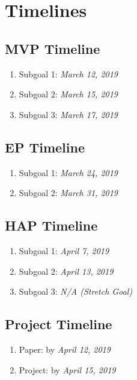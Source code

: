 \documentclass[fleqn,10pt]{SelfArx} %
\begin{document}
	\section{Timelines} %
	\subsection{MVP Timeline}
	\begin{enumerate}
		\item Subgoal 1: \textit{March 12, 2019}
		\item Subgoal 2: \textit{March 15, 2019}
		\item Subgoal 3: \textit{March 17, 2019}
	\end{enumerate}
	
	\subsection{EP Timeline}
	\begin{enumerate}
		\item Subgoal 1: \textit{March 24, 2019}
		\item Subgoal 2: \textit{March 31, 2019}
	\end{enumerate}
	
	\subsection{HAP Timeline}
	\begin{enumerate}
		\item Subgoal 1: \textit{April 7, 2019}
		\item Subgoal 2: \textit{April 13, 2019}
		\item Subgoal 3: \textit{N/A (Stretch Goal)}
	\end{enumerate}
	
	\subsection{Project Timeline}
	\begin{enumerate}
		\item Paper: by \textit{April 12, 2019}
		\item Project: by \textit{April 15, 2019}
	\end{enumerate}
	
\end{document}
